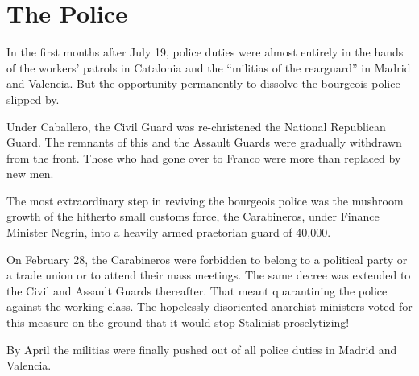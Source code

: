 \section*{The Police}

In the first months after July 19, police duties were almost entirely in the hands of the workers’ patrols in Catalonia and the ``militias of the rearguard'' in Madrid and Valencia. But the opportunity permanently to dissolve the bourgeois police slipped by.
\nowidow

Under Caballero, the Civil Guard was re-christened the National Republican Guard. The remnants of this and the Assault Guards were gradually withdrawn from the front. Those who had gone over to Franco were more than replaced by new men.

The most extraordinary step in reviving the bourgeois police was the mushroom growth of the hitherto small customs force, the Carabineros, under Finance Minister Negrin, into a heavily armed praetorian guard of 40,000.

On February 28, the Carabineros were forbidden to belong to a political party or a trade union or to attend their mass meetings. The same decree was extended to the Civil and Assault Guards thereafter. That meant quarantining the police against the working class. The hopelessly disoriented anarchist ministers voted for this measure on the ground that it would stop Stalinist proselytizing!

By April the militias were finally pushed out of all police duties in Madrid and Valencia.

